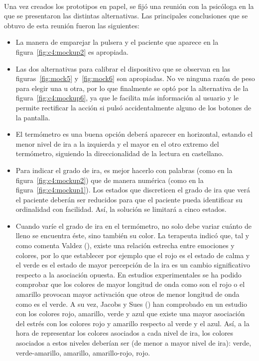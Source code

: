 \paragraph{}
Una vez creados los prototipos en papel, se fijó una reunión con la psicóloga en la que se presentaron las distintas alternativas. Las principales conclusiones que se obtuvo de esta reunión fueron las siguientes:
\begin{itemize}
    \item La manera de emparejar la pulsera y el paciente que aparece en la figura~\ref{fig:c4:mockup2} es apropiada.
    \item Las dos alternativas para calibrar el dispositivo que se observan en las figuras~\ref{fig:mock5} y~\ref{fig:mock6} son apropiadas. No ve ninguna razón de peso para elegir una u otra, por lo que finalmente se optó por la alternativa de la figura~\ref{fig:c4:mockup6}, ya que le facilita más información al usuario y le permite rectificar la acción si pulsó accidentalmente alguno de los botones de la pantalla.
    \item El termómetro es una buena opción deberá aparecer en horizontal, estando el menor nivel de ira a la izquierda y el mayor en el otro extremo del termómetro, siguiendo la direccionalidad de la lectura en castellano.
    \item Para indicar el grado de ira, es mejor hacerlo con palabras (como en la figura~\ref{fig:c4:mockup2}) que de manera numérica (como en la figura~\ref{fig:c4:mockup1}). Los estados que discreticen el grado de ira que verá el paciente deberán ser reducidos para que el paciente pueda identificar su ordinalidad con facilidad. Así, la solución se limitará a cinco estados.
    \item Cuando varíe el grado de ira en el termómetro, no solo debe variar cuánto de lleno se encuentra éste, sino también su color. La terapeuta indicó que, tal y como comenta Valdez (\citeyear{valdez1994effects}), existe una relación estrecha entre emociones y colores, por lo que establecer por ejemplo que el rojo es el estado de calma y el verde es el estado de mayor percepción de la ira es un cambio significativo respecto a la asociación opuesta. En estudios experimentales se ha podido comprobar que los colores de mayor longitud de onda como son el rojo o el amarillo provocan mayor activación que otros de menor longitud de onda como es el verde. A su vez, Jacobs y Sues (\citeyear{jacobs1975effects}) han comprobado en un estudio con los colores rojo, amarillo, verde y azul que existe una mayor asociación del estrés con los colores rojo y amarillo respecto al verde y el azul. Así, a la hora de representar los colores asociados a cada nivel de ira, los colores asociados a estos niveles deberían ser (de menor a mayor nivel de ira): verde, verde-amarillo, amarillo, amarillo-rojo, rojo.

\end{itemize}
